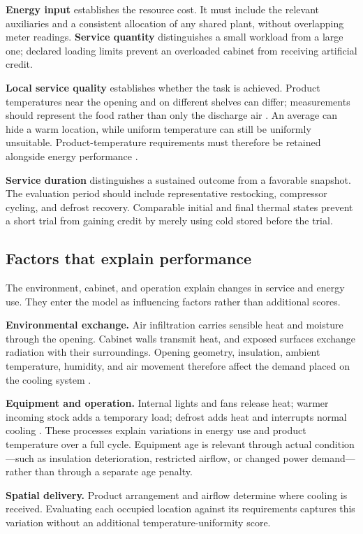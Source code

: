 \documentclass[12pt]{article}
\begin{document}
\noindent\textbf{Energy input} establishes the resource cost. It must include the relevant auxiliaries and a consistent allocation of any shared plant, without overlapping meter readings. \textbf{Service quantity} distinguishes a small workload from a large one; declared loading limits prevent an overloaded cabinet from receiving artificial credit.

\textbf{Local service quality} establishes whether the task is achieved. Product temperatures near the opening and on different shelves can differ; measurements should represent the food rather than only the discharge air \cite{ashrae}. An average can hide a warm location, while uniform temperature can still be uniformly unsuitable. Product-temperature requirements must therefore be retained alongside energy performance \cite{etl}.

\textbf{Service duration} distinguishes a sustained outcome from a favorable snapshot. The evaluation period should include representative restocking, compressor cycling, and defrost recovery. Comparable initial and final thermal states prevent a short trial from gaining credit by merely using cold stored before the trial.

\clearpage
\subsection{Factors that explain performance}

The environment, cabinet, and operation explain changes in service and energy use. They enter the model as influencing factors rather than additional scores.

\noindent\textbf{Environmental exchange.} Air infiltration carries sensible heat and moisture through the opening. Cabinet walls transmit heat, and exposed surfaces exchange radiation with their surroundings. Opening geometry, insulation, ambient temperature, humidity, and air movement therefore affect the demand placed on the cooling system \cite{ashrae}.

\noindent\textbf{Equipment and operation.} Internal lights and fans release heat; warmer incoming stock adds a temporary load; defrost adds heat and interrupts normal cooling \cite{ashrae}. These processes explain variations in energy use and product temperature over a full cycle. Equipment age is relevant through actual condition---such as insulation deterioration, restricted airflow, or changed power demand---rather than through a separate age penalty.

\noindent\textbf{Spatial delivery.} Product arrangement and airflow determine where cooling is received. Evaluating each occupied location against its requirements captures this variation without an additional temperature-uniformity score.
\end{document}
